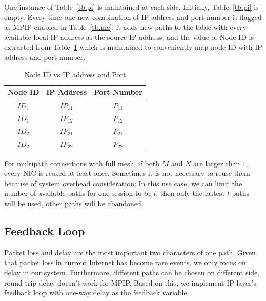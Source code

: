 One instance of Table~\ref{tb.pi} is maintained at each side. Initially, Table~\ref{tb.pi} is empty. Every time one new combination of IP address and port number is flagged as MPIP enabled in Table~\ref{tb.me}, it adds new paths to the table with every available local IP address as the source IP address, and the value of Node ID is extracted from Table~\ref{tb.wi} which is maintained to conveniently map node ID with IP address and port number.


\begin{table}[htbp]
\caption{\label{tb.wi}Node ID vs IP address and Port}
\centering
\begin{tabular}{|c|c|c|}
\hline
 Node ID  & IP Address & Port Number\\
\hline
${ID}_{1}$&${IP}_{11}$&${P}_{11}$ \\
\hline
${ID}_{1}$&${IP}_{12}$&${P}_{12}$ \\
\hline
${ID}_{2}$&${IP}_{21}$&${P}_{21}$ \\
\hline
${ID}_{2}$&${IP}_{22}$&${P}_{22}$ \\
\hline
\end{tabular}
\end{table}

For multipath connections with full mesh, if both $M$ and $N$ are larger than $1$, every NIC is reused at least once. Sometimes it is not necessary to reuse them because of system overhead consideration; In this use case, we can limit the number of available paths for one session to be $l$, then only the fastest $l$ paths will be used, other paths will be abandoned.

\subsection{Feedback Loop}
\label{sec:feedback}

Packet loss and delay are the most important two characters of one path. Given that packet loss in current Internet has become rare events, we only focus on delay in our system. Furthermore, different paths can be chosen on different side, round trip delay doesn't work for MPIP. Based on this, we implement IP layer's feedback loop with one-way delay as the feedback variable.

